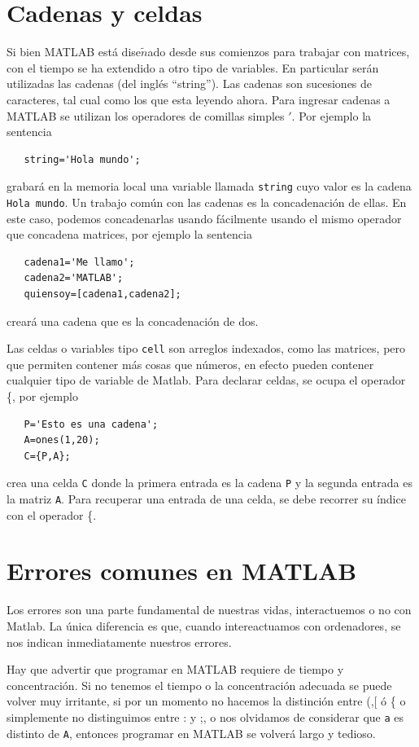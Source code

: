\documentclass[11pt]{article}
\begin{document}
\section{Cadenas y celdas}
  Si bien MATLAB est\'a dise$\tilde{n}$ado desde sus comienzos para trabajar con matrices, con el tiempo se ha extendido a otro tipo de variables. En particular ser\'an utilizadas las cadenas (del ingl\'es ``string''). Las cadenas son sucesiones de caracteres, tal cual como los que esta leyendo ahora. Para ingresar cadenas a MATLAB se utilizan los operadores de comillas simples $'$. Por ejemplo la sentencia
  \begin{verbatim}
   string='Hola mundo';
  \end{verbatim}
  grabar\'a en la memoria local una variable llamada \texttt{string} cuyo valor es la cadena \texttt{Hola mundo}. Un trabajo com\'un con las cadenas es la concadenaci\'on de ellas. En este caso, podemos concadenarlas usando f\'acilmente usando el mismo operador que concadena matrices, por ejemplo la sentencia
  \begin{verbatim}
   cadena1='Me llamo';
   cadena2='MATLAB';
   quiensoy=[cadena1,cadena2];
  \end{verbatim}
  crear\'a una cadena que es la concadenaci\'on de dos.
  
  Las celdas o variables tipo \texttt{cell} son arreglos indexados, como las matrices, pero que permiten contener m\'as cosas que n\'umeros, en efecto pueden contener cualquier tipo de variable de Matlab. Para declarar celdas, se ocupa el operador \{, por ejemplo
  \begin{verbatim}
   P='Esto es una cadena';
   A=ones(1,20);
   C={P,A};
  \end{verbatim}
  crea una celda \texttt{C} donde la primera entrada es la cadena \texttt{P} y la segunda entrada es la matriz \texttt{A}. 
  Para recuperar una entrada de una celda, se debe recorrer su \'indice con el operador \{.


\section{Errores comunes en MATLAB}
Los errores son una parte fundamental de nuestras vidas, interactuemos o no con Matlab. La única diferencia es que, cuando intereactuamos con ordenadores, se nos indican inmediatamente nuestros errores.

Hay que advertir que programar en MATLAB requiere de tiempo y concentración. Si no tenemos el tiempo o la concentración adecuada se puede volver muy irritante, si por un momento no hacemos la distinción entre (,[ \'o \{ o simplemente no distinguimos entre : y ;, o nos olvidamos de considerar que \texttt{a} es distinto de \texttt{A}, entonces programar en MATLAB se volverá largo y tedioso.
\end{document}
